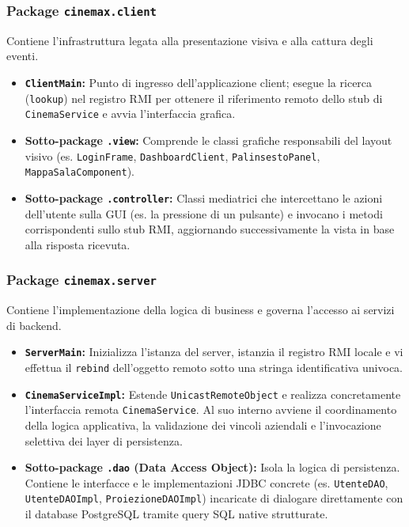 \documentclass[12pt, a4paper]{article}
\begin{document}
\subsubsection{Package \texttt{cinemax.client}}
Contiene l'infrastruttura legata alla presentazione visiva e alla cattura degli eventi.
\begin{itemize}
    \item \textbf{\texttt{ClientMain}:} Punto di ingresso dell'applicazione client; esegue la ricerca (\texttt{lookup}) nel registro RMI per ottenere il riferimento remoto dello stub di \texttt{CinemaService} e avvia l'interfaccia grafica.
    \item \textbf{Sotto-package \texttt{.view}:} Comprende le classi grafiche responsabili del layout visivo (es. \texttt{LoginFrame}, \texttt{DashboardClient}, \texttt{PalinsestoPanel}, \texttt{MappaSalaComponent}). 
    \item \textbf{Sotto-package \texttt{.controller}:} Classi mediatrici che intercettano le azioni dell'utente sulla GUI (es. la pressione di un pulsante) e invocano i metodi corrispondenti sullo stub RMI, aggiornando successivamente la vista in base alla risposta ricevuta.
\end{itemize}

\subsubsection{Package \texttt{cinemax.server}}
Contiene l'implementazione della logica di business e governa l'accesso ai servizi di backend.
\begin{itemize}
    \item \textbf{\texttt{ServerMain}:} Inizializza l'istanza del server, istanzia il registro RMI locale e vi effettua il \texttt{rebind} dell'oggetto remoto sotto una stringa identificativa univoca.
    \item \textbf{\texttt{CinemaServiceImpl}:} Estende \texttt{UnicastRemoteObject} e realizza concretamente l'interfaccia remota \texttt{CinemaService}. Al suo interno avviene il coordinamento della logica applicativa, la validazione dei vincoli aziendali e l'invocazione selettiva dei layer di persistenza.
    \item \textbf{Sotto-package \texttt{.dao} (Data Access Object):} Isola la logica di persistenza. Contiene le interfacce e le implementazioni JDBC concrete (es. \texttt{UtenteDAO}, \texttt{UtenteDAOImpl}, \texttt{ProiezioneDAOImpl}) incaricate di dialogare direttamente con il database PostgreSQL tramite query SQL native strutturate.
\end{itemize}
\end{document}
